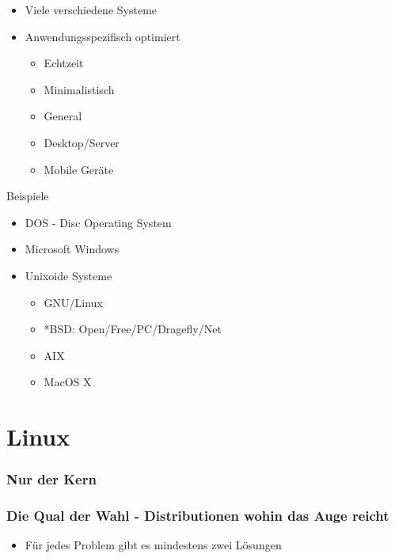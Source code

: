 \documentclass[compress]{beamer}
\begin{document}
\begin{frame}
	\begin{block}{}
		\begin{itemize}
			\item Viele verschiedene Systeme 
			\item Anwendungsspezifisch optimiert
				\begin{itemize}
					\item Echtzeit
					\item Minimalistisch
					\item General
					\item Desktop/Server
					\item Mobile Geräte 
				\end{itemize}
		\end{itemize}
	\end{block}
	\begin{block}{Beispiele}
		\begin{itemize}
			\item DOS - Disc Operating System
			\item Microsoft Windows
			\item Unixoide Systeme
				\begin{itemize}
					\item GNU/Linux
					\item *BSD: Open/Free/PC/Dragefly/Net
					\item AIX
					\item MacOS X
				\end{itemize}
		\end{itemize}
	\end{block}
\end{frame}

\section{Linux}

\begin{frame}
	\frametitle{Nur der Kern}
\end{frame}

\begin{frame}
	\frametitle{Die Qual der Wahl - Distributionen wohin das Auge reicht}
	\begin{block}{}
		\begin{itemize}
			\item Für jedes Problem gibt es mindestens zwei Lösungen
		\end{itemize}
	\end{block}
\end{frame}
\end{document}
